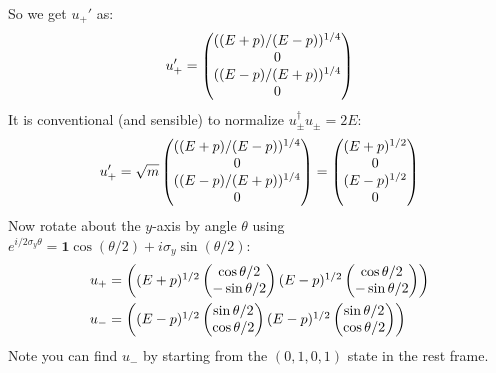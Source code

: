 So we get $u_+'$ as:
\begin{align*}
  u_+'=\pmqty{((E+p)/(E-p))^{1/4}\\0\\((E-p)/(E+p))^{1/4}\\0}
\end{align*}
It is conventional (and sensible) to normalize $u_\pm^\dag u_\pm=2E$:
\begin{align*}
  u_+'=\sqrt{m}\pmqty{((E+p)/(E-p))^{1/4}\\0\\((E-p)/(E+p))^{1/4}\\0}
  =\pmqty{(E+p)^{1/2}\\0\\(E-p)^{1/2}\\0}
\end{align*}
Now rotate about the $y$-axis by angle $\theta$ using
$e^{i/2\sigma_y\theta}=\bm{1}\cos(\theta/2)+i\sigma_y\sin(\theta/2)$:
\begin{align*}
  u_{+}&=\pmqty{
    (E+p)^{1/2}\pmqty{\cos\theta/2\\-\sin\theta/2}
    (E-p)^{1/2}\pmqty{\cos\theta/2\\-\sin\theta/2}
  }\\
  u_{-}&=\pmqty{
    (E-p)^{1/2}\pmqty{\sin\theta/2\\\cos\theta/2}
    (E-p)^{1/2}\pmqty{\sin\theta/2\\\cos\theta/2}
  }
\end{align*}
Note you can find $u_-$ by starting from the $(0,1,0,1)$ state in the rest frame.

